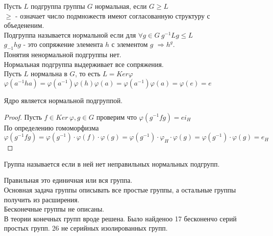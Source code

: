 \begin{defin}
	Пусть $L$ подгруппа группы $G$ нормальная, если  $G \ge L$\\
	$\ge$ - означает число подмножеств имеют согласованную структуру с объедененим.\\
	Подгруппа называется нормальной если для $\forall g \in G ~ g^{-1} Lg \le L$\\
	$g_{-1} hg$ - это сопряжение элемента $h$ с элементом $g$
           $\Rightarrow h^g$.\\
	Понятия ненормальной подгруппы нет.\\
	Нормальная подгруппа выдерживает все сопряжения.\\
          
           Пусть $L$ нормальна в $G$, то есть $L = Ker \varphi$\\
           $\varphi(a^{-1}ha) = \varphi(a^{-1})\varphi(h)\varphi(a) = \varphi(a^{-1})\varphi(a) = \varphi(e) = e$\\
\end{defin}

\begin{defin}
	Ядро является нормальной подгруппой.
\end{defin}

\begin{proof}
	Пусть $f \in Ker~\varphi, g\in G$ проверим что $\varphi(g^{-1}fg) = ei_H$\\
	По определению гомоморфизма $\varphi(g^{-1} fg) = \varphi(g^{-1}) \cdot
	\varphi(f) \cdot \varphi(g) = \varphi(g^{-1}) \cdot \varphi_H \cdot
	\varphi(g) = \varphi(g^{-1}) \cdot \varphi(g) = e_H$
\end{proof}

\begin{defin}
Группа называется  если в ней нет неправильных нормальных подгрупп.
\end{defin}
Правильная это единичная или вся группа.\\

Основная задача группы описывать все простые группы, а остальные группы получить
из расширения.\\

Бесконечные группы не описаны.\\

В теории конечных групп вроде решена. Было найденоо 17 бесконенчо серий простых
групп. 26 не серийных изолированных групп.\\\\

